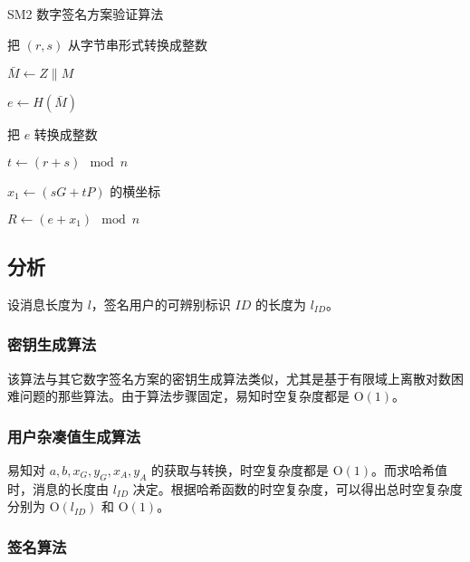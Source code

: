 \documentclass[12pt,a4paper]{article}
\begin{document}
\begin{algorithm}[H]
\caption{SM2 数字签名方案验证算法}
\KwData{}

把 $ (r, s) $ 从字节串形式转换成整数


$ \bar{M} \leftarrow Z \parallel M $

$ e \leftarrow H(\bar{M}) $

把 $ e $ 转换成整数

$ t \leftarrow (r + s) \mod n $


$ x_1 \leftarrow (s G + t P) $ 的横坐标

$ R \leftarrow (e + x_1) \mod n $

{
}
\end{algorithm}

\subsection*{分析}

设消息长度为 $ l $，签名用户的可辨别标识 $ ID $ 的长度为 $ l_{ID} $。

\subsubsection*{密钥生成算法}

该算法与其它数字签名方案的密钥生成算法类似，尤其是基于有限域上离散对数困难问题的那些算法。由于算法步骤固定，易知时空复杂度都是 $ \mathrm{O}(1) $。

\subsubsection*{用户杂凑值生成算法}

易知对 $ a, b, x_G, y_G, x_A, y_A $ 的获取与转换，时空复杂度都是 $ \mathrm{O}(1) $。而求哈希值时，消息的长度由 $ l_{ID} $ 决定。根据哈希函数的时空复杂度，可以得出总时空复杂度分别为 $ \mathrm{O}(l_{ID}) $ 和 $ \mathrm{O}(1) $。

\subsubsection*{签名算法}
\end{document}
